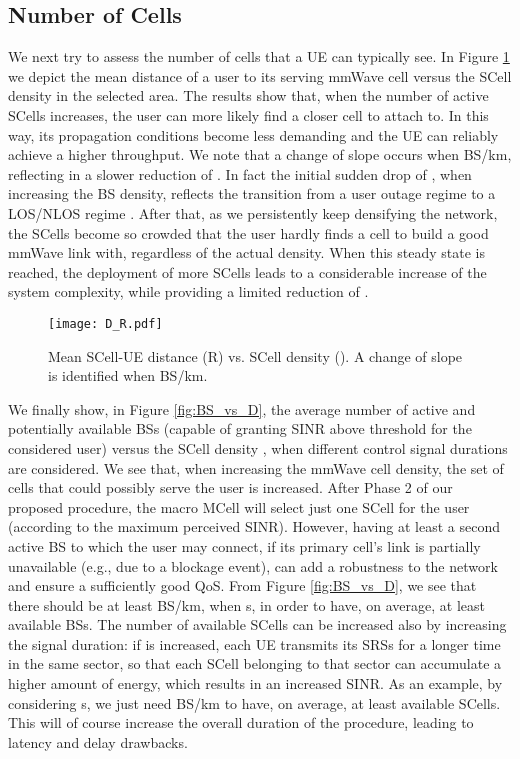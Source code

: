 \documentclass[conference,a4paper]{IEEEtran}
\begin{document}
\subsection{Number of Cells}

We next try to assess the number of cells that a UE can typically see.
In Figure  \ref{fig:D_R} we depict the mean distance  of a user to its  serving mmWave cell versus the SCell density  in the selected area. The results show that, when the number of active SCells increases, the  user can more likely find a closer cell to attach to. In this way, its propagation conditions become less demanding and the UE can reliably achieve a higher throughput. We note that a change of slope occurs when  BS/km, reflecting in a slower reduction of . In fact the initial sudden drop of , when increasing the BS density, reflects the transition from a user outage regime to a LOS/NLOS regime \cite{Mustafa}.
 After that,  as we  persistently keep  densifying the network, the SCells become so crowded that the user hardly  finds a cell to build a good mmWave link with, regardless of the actual density.
  When this steady state is reached, the deployment of more SCells leads to a considerable increase of the system complexity, while providing a limited reduction of .



  \begin{figure}[t!]
\centering
 \texttt{[image: D\_R.pdf]}
 \caption{Mean SCell-UE distance (R) vs. SCell density (). A change of slope is identified when  BS/km.}
 \label{fig:D_R}
\end{figure}

We finally show, in Figure  \ref{fig:BS_vs_D}, the average number of active and potentially available BSs (capable of granting SINR above threshold for the considered user) versus the SCell density , when different control signal durations  are considered.
We see that, when increasing the mmWave cell density, the set of cells that could possibly serve the user is increased. After  Phase 2 of our proposed procedure, the macro MCell will select just one SCell for the user (according to the maximum perceived SINR). However, having at least a second active BS  to which the user may connect, if its primary cell's link is partially unavailable (e.g., due to a blockage event), can add a robustness to the network and ensure a sufficiently  good QoS. From Figure \ref{fig:BS_vs_D}, we see that there should be at least  BS/km, when s, in order to have, on average, at least  available BSs.
The number of available SCells can be increased also by increasing the signal duration: if  is increased, each UE transmits its SRSs for a longer time in the same sector, so that each SCell belonging to that sector can accumulate a higher amount of energy, which results in an increased SINR.
As an example, by considering s, we just need  BS/km to have, on average, at least  available SCells. This will of course increase the overall duration of the  procedure, leading to latency and delay drawbacks.
\end{document}
